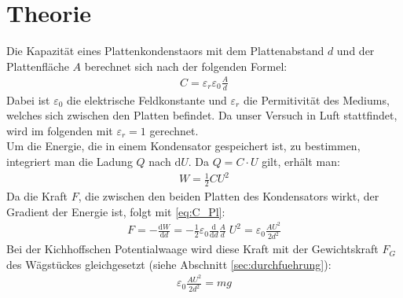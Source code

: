 \documentclass[12pt,a4paper,titlepage,headinclude,bibtotoc]{scrartcl}
\newcommand{\dif}{\ensuremath{\mathrm{d}}}
\begin{document}
\section{Theorie}
\label{sec:theorie}
Die Kapazität eines Plattenkondenstaors mit dem Plattenabstand $d$ und der Plattenfläche $A$ berechnet sich nach der folgenden Formel:
\begin{align}
 C=\varepsilon_r\varepsilon_0\frac{A}{d}
 \label{eq:C_Pl}
\end{align}
Dabei ist $\varepsilon_0$ die elektrische Feldkonstante und $\varepsilon_r$ die Permitivität des Mediums, welches sich zwischen den Platten befindet.
Da unser Versuch in Luft stattfindet, wird im folgenden mit $\varepsilon_r=1$ gerechnet.\\
Um die Energie, die in einem Kondensator gespeichert ist, zu bestimmen, integriert man die Ladung $Q$ nach $\dif U$.
Da $Q=C\cdot U$ gilt, erhält man:
\begin{align}
 W=\frac{1}{2} C U^2
\end{align}
Da die Kraft $F$, die zwischen den beiden Platten des Kondensators wirkt, der Gradient der Energie ist, folgt mit \eqref{eq:C_Pl}:
\begin{align}
 F=-\frac{\dif W}{\dif d}= -\frac{1}{2}\varepsilon_0\frac{\dif}{\dif d}\frac{A}{d} \;U^2 =\varepsilon_0\frac{A U^2}{2 d^2}
 \label{eq:F_Pl}
\end{align}
Bei der Kichhoffschen Potentialwaage wird diese Kraft mit der Gewichtskraft $F_G$ des Wägstückes gleichgesetzt (siehe Abschnitt \ref{sec:durchfuehrung}):
\begin{align}
 \varepsilon_0\frac{A U^2}{2 d^2}=mg
 \label{eq:PotWaage}
\end{align}
\end{document}
